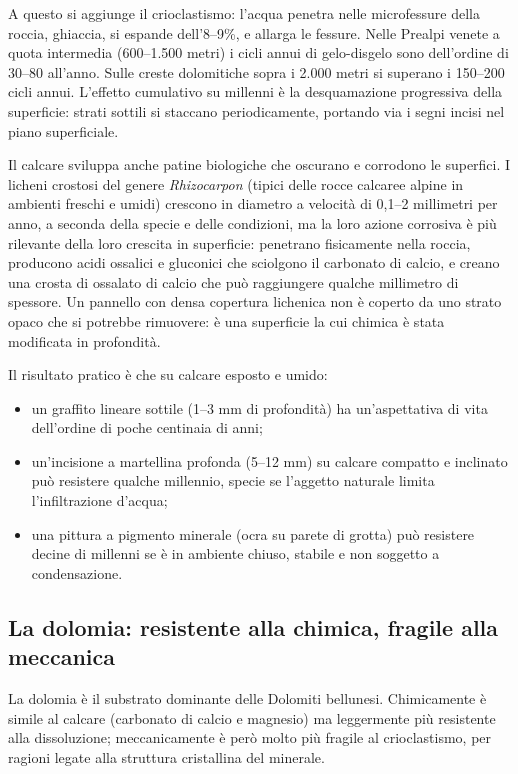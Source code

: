 A questo si aggiunge il crioclastismo: l'acqua penetra nelle microfessure della roccia, ghiaccia, si espande dell'8--9\%, e allarga le fessure. Nelle Prealpi venete a quota intermedia (600--1.500 metri) i cicli annui di gelo-disgelo sono dell'ordine di 30--80 all'anno. Sulle creste dolomitiche sopra i 2.000 metri si superano i 150--200 cicli annui. L'effetto cumulativo su millenni è la desquamazione progressiva della superficie: strati sottili si staccano periodicamente, portando via i segni incisi nel piano superficiale.

Il calcare sviluppa anche patine biologiche che oscurano e corrodono le superfici. I licheni crostosi del genere \textit{Rhizocarpon} (tipici delle rocce calcaree alpine in ambienti freschi e umidi) crescono in diametro a velocità di 0,1--2 millimetri per anno, a seconda della specie e delle condizioni, ma la loro azione corrosiva è più rilevante della loro crescita in superficie: penetrano fisicamente nella roccia, producono acidi ossalici e gluconici che sciolgono il carbonato di calcio, e creano una crosta di ossalato di calcio che può raggiungere qualche millimetro di spessore. Un pannello con densa copertura lichenica non è coperto da uno strato opaco che si potrebbe rimuovere: è una superficie la cui chimica è stata modificata in profondità.

Il risultato pratico è che su calcare esposto e umido:
\begin{itemize}
\item un graffito lineare sottile (1--3 mm di profondità) ha un'aspettativa di vita dell'ordine di poche centinaia di anni;
\item un'incisione a martellina profonda (5--12 mm) su calcare compatto e inclinato può resistere qualche millennio, specie se l'aggetto naturale limita l'infiltrazione d'acqua;
\item una pittura a pigmento minerale (ocra su parete di grotta) può resistere decine di millenni se è in ambiente chiuso, stabile e non soggetto a condensazione.
\end{itemize}

\subsection{La dolomia: resistente alla chimica, fragile alla meccanica}

La dolomia è il substrato dominante delle Dolomiti bellunesi. Chimicamente è simile al calcare (carbonato di calcio e magnesio) ma leggermente più resistente alla dissoluzione; meccanicamente è però molto più fragile al crioclastismo, per ragioni legate alla struttura cristallina del minerale.

